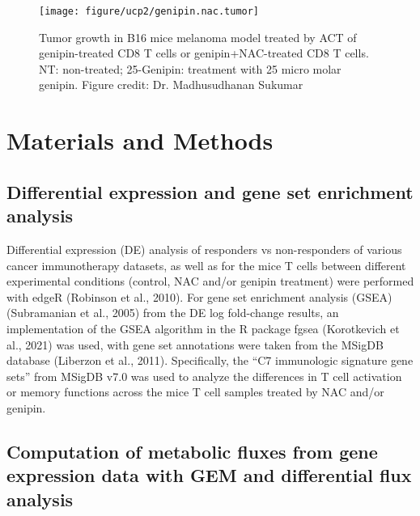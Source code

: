\documentclass[12pt,twoside,openany,\mydriver]{thesis}  %
\begin{document}
\begin{figure}
\texttt{[image: figure/ucp2/genipin.nac.tumor]} \caption{Tumor growth in B16 mice melanoma model treated by ACT of genipin-treated CD8 T cells or genipin+NAC-treated CD8 T cells. NT: non-treated; 25-Genipin: treatment with 25 micro molar genipin. Figure credit: Dr. Madhusudhanan Sukumar}\label{fig:ucp2-genipin-nac-tumor}
\end{figure}
\hypertarget{materials-and-methods-1}{%
\section{Materials and Methods}\label{materials-and-methods-1}}

\hypertarget{differential-expression-and-gene-set-enrichment-analysis}{%
\subsection{Differential expression and gene set enrichment analysis}\label{differential-expression-and-gene-set-enrichment-analysis}}

Differential expression (DE) analysis of responders vs non-responders of various cancer immunotherapy datasets, as well as for the mice T cells between different experimental conditions (control, NAC and/or genipin treatment) were performed with edgeR (Robinson et al., 2010). For gene set enrichment analysis (GSEA) (Subramanian et al., 2005) from the DE log fold-change results, an implementation of the GSEA algorithm in the R package fgsea (Korotkevich et al., 2021) was used, with gene set annotations were taken from the MSigDB database (Liberzon et al., 2011). Specifically, the ``C7 immunologic signature gene sets'' from MSigDB v7.0 was used to analyze the differences in T cell activation or memory functions across the mice T cell samples treated by NAC and/or genipin.

\hypertarget{computation-of-metabolic-fluxes-from-gene-expression-data-with-gem-and-differential-flux-analysis}{%
\subsection{Computation of metabolic fluxes from gene expression data with GEM and differential flux analysis}\label{computation-of-metabolic-fluxes-from-gene-expression-data-with-gem-and-differential-flux-analysis}}
\end{document}
